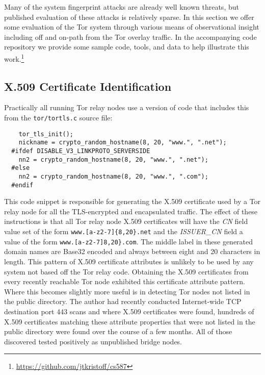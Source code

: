 \documentclass[sigconf]{acmart}
\begin{document}
Many of the system fingerprint attacks are already well known threats,
but published evaluation of these attacks is relatively sparse.  In this
section we offer some evaluation of the Tor system through various means
of observational insight including off and on-path from the Tor overlay
traffic.  In the accompanying code repository we provide some sample
code, tools, and data to help illustrate this
work.\footnote{\url{https://github.com/jtkristoff/cs587}}

\subsection{X.509 Certificate Identification}

Practically all running Tor relay nodes use a version of code that
includes this from the \texttt{tor/tortls.c} source file:

\begin{footnotesize}
\begin{verbatim}
    tor_tls_init();
    nickname = crypto_random_hostname(8, 20, "www.", ".net");
  #ifdef DISABLE_V3_LINKPROTO_SERVERSIDE
    nn2 = crypto_random_hostname(8, 20, "www.", ".net");
  #else
    nn2 = crypto_random_hostname(8, 20, "www.", ".com");
  #endif
\end{verbatim}
\end{footnotesize}

This code snippet is responsible for generating the X.509 certificate
used by a Tor relay node for all the TLS-encrypted and encapsulated
traffic.  The effect of these instructions is that all Tor relay node
X.509 certificates will have the \emph{CN} field value set of the form
\texttt{www.[a-z2-7]\{8,20\}.net} and the \emph{ISSUER\_CN} field a
value of the form \texttt{www.[a-z2-7]8,20\}.com}.  The middle label in
these generated domain names are Base32 encoded and always between eight
and 20 characters in length.  This pattern of X.509 certificate
attributes is unlikely to be used by any system not based off the Tor
relay code.  Obtaining the X.509 certificates from every recently
reachable Tor node exhibited this certificate attribute pattern.  Where
this becomes slightly more useful is in detecting Tor nodes not listed
in the public directory.  The author had recently conducted
Internet-wide TCP destination port 443 scans and where X.509
certificates were found, hundreds of X.509 certificates matching these
attribute properties that were not listed in the public directory were
found over the course of a few months.  All of those discovered tested
positively as unpublished bridge nodes.
\end{document}
